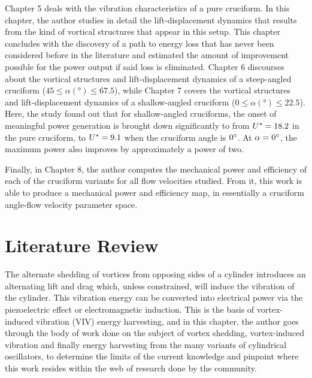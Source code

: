 \documentclass[oneside]{utmthesis}
\begin{document}
Chapter 5 deals with the vibration characteristics of a pure cruciform. In this chapter, the author studies in detail the lift-displacement dynamics that results from the kind of vortical structures that appear in this setup. This chapter concludes with the discovery of a path to energy loss that has never been considered before in the literature and estimated the amount of improvement possible for the power output if said loss is eliminated. Chapter 6 discourses about the vortical structures and lift-displacement dynamics of a steep-angled cruciform ($45 \le \alpha (\si{\degree}) \le 67.5$), while Chapter 7 covers the vortical structures and lift-displacement dynamics of a shallow-angled cruciform ($0 \le \alpha (\si{\degree}) \le 22.5$). Here, the study found out that for shallow-angled cruciforms, the onset of meaningful power generation is brought down significantly to from $U^{*} = 18.2$ in the pure cruciform, to $U^{*} = 9.1$ when the cruciform angle is $\angon$. At $\alpha = \angon$, the maximum power also improves by approximately a power of two.

Finally, in Chapter 8, the author computes the mechanical power and efficiency of each of the cruciform variants for all flow velocities studied. From it, this work is able to produce a mechanical power and efficiency map, in essentially a cruciform angle-flow velocity parameter space.

\chapter{Literature Review} \label{chap:literatureReview}
The alternate shedding of vortices from opposing sides of a cylinder introduces an alternating lift and drag which, unless constrained, will induce the vibration of the cylinder. This vibration energy can be converted into electrical power via the piezoelectric effect or electromagnetic induction. This is the basis of vortex-induced vibration (VIV) energy harvesting, and in this chapter, the author goes through the body of work done on the subject of vortex shedding, vortex-induced vibration and finally energy harvesting from the many variants of cylindrical oscillators, to determine the limits of the current knowledge and pinpoint where this work resides within the web of research done by the community.
\end{document}
